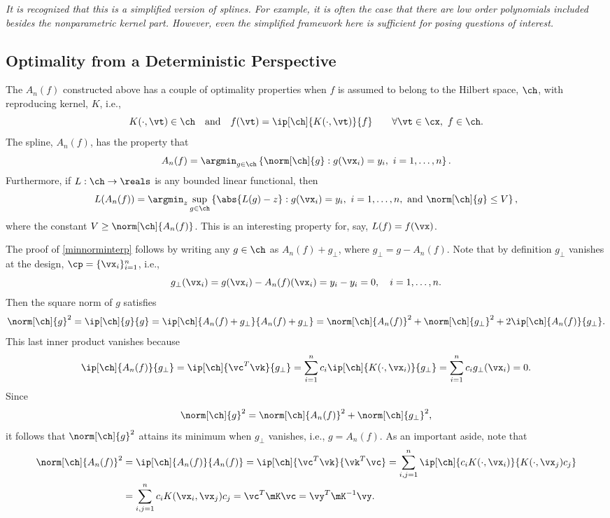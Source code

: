 \documentclass[11pt]{amsart}
\theoremstyle{definition}
\begin{document}
\emph{It is recognized that this is a simplified version of splines.  For example, it is often the case that there are low order polynomials included besides the nonparametric kernel part.  However, even the simplified framework here is sufficient for posing questions of interest.}

\subsection{Optimality from a Deterministic Perspective \cite{Fas07a,Wen05a}}
The $A_n(f)$ constructed above has a couple of optimality properties when $f$ is assumed to belong to the Hilbert space, $\ch$, with reproducing kernel, $K$, i.e.,
\begin{equation*}
K(\cdot, \vt) \in \ch \quad \text{and} \quad f(\vt) = \ip[\ch]{K(\cdot,\vt)}{f} \qquad \forall \vt \in \cx,\ f \in \ch .
\end{equation*}
The spline, $A_n(f)$, has the property that
\begin{equation} \label{minnorminterp}
A_n(f) = \argmin_{g \in \ch } \left \{ \norm[\ch]{g} : g(\vx_i) = y_i,\ i=1, \ldots, n \right \}.
\end{equation}
Furthermore, if $L:\ch \to \reals$ is any bounded linear functional, then
\begin{equation} \label{bestlinfunctional}
L(A_n(f)) = \argmin_z \sup_{g \in \ch } \left \{ \abs{L(g) - z} : g(\vx_i) = y_i,\ i=1, \ldots, n, \text{ and } \norm[\ch]{g} \le V \right \},
\end{equation}
where the constant $V\ge\norm[\ch]{A_n(f)}$. This is an interesting property for, say, $L(f) = f(\vx)$.

The proof of \eqref{minnorminterp} follows by writing any $g \in \ch$ as $A_n(f) + g_{\perp}$, where $g_{\perp} = g -A_n(f)$.  Note that by definition $g_{\perp}$ vanishes at the design, $\cp=\{\vx_i\}_{i=1}^n$, i.e.,
\[
g_{\perp}(\vx_i) = g(\vx_i) - A_n(f)(\vx_i) = y_i - y_i = 0, \quad i=1, \dots, n.
\]
Then the square norm of $g$ satisfies
\begin{equation*}
\norm[\ch]{g}^2 = \ip[\ch]{g}{g} = \ip[\ch]{A_n(f)+g_{\perp}}{A_n(f)+g_{\perp}} = \norm[\ch]{A_n(f)}^2 + \norm[\ch]{g_{\perp}}^2 + 2 \ip[\ch]{A_n(f)}{g_{\perp}}.
\end{equation*}
This last inner product vanishes because
\begin{equation*}
\ip[\ch]{A_n(f)}{g_{\perp}} = \ip[\ch]{\vc^T \vk}{g_{\perp}} =  \sum_{i=1}^{n} c_i \ip[\ch]{K(\cdot,\vx_i)}{g_{\perp}}=  \sum_{i=1}^{n} c_i g_{\perp}(\vx_i) = 0.
\end{equation*}
Since
\[
\norm[\ch]{g}^2 = \norm[\ch]{A_n(f)}^2 + \norm[\ch]{g_{\perp}}^2,
\]
it follows that $\norm[\ch]{g}^2$ attains its minimum when $g_{\perp}$ vanishes, i.e., $g=A_n(f)$.  As an important aside, note that
\begin{align*}
\norm[\ch]{A_n(f)}^2 &= \ip[\ch]{A_n(f)}{A_n(f)} = \ip[\ch]{\vc^T \vk}{\vk^T \vc} = \sum_{i,j=1}^n \ip[\ch]{c_i K(\cdot, \vx_i)}{K(\cdot, \vx_j) c_j}\\
&= \sum_{i,j=1}^n c_i K(\vx_i, \vx_j) c_j = \vc^T \mK \vc = \vy^T \mK^{-1} \vy.
\end{align*}
\end{document}
